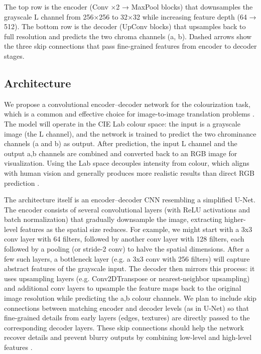 \documentclass{article} %
\begin{document}
The top row is the encoder (Conv ×2 → MaxPool blocks) that downsamples the grayscale L channel from 256×256 to 32×32 while increasing feature depth (64 → 512).
The bottom row is the decoder (UpConv blocks) that upsamples back to full resolution and predicts the two chroma channels (a, b). Dashed arrows show the three skip connections that pass fine-grained features from encoder to decoder stages.

\subsection{Architecture}

We propose a convolutional encoder–decoder network for the colourization task, which is a common and effective choice for image-to-image translation problems \cite{leatvanich2025image}. The model will operate in the CIE Lab colour space: the input is a grayscale image (the L channel), and the network is trained to predict the two chrominance channels (a and b) as output. After prediction, the input L channel and the output a,b channels are combined and converted back to an RGB image for visualization. Using the Lab space decouples intensity from colour, which aligns with human vision and generally produces more realistic results than direct RGB prediction \cite{leatvanich2025image}.

The architecture itself is an encoder–decoder CNN resembling a simplified U-Net. The encoder consists of several convolutional layers (with ReLU activations and batch normalization) that gradually downsample the image, extracting higher-level features as the spatial size reduces. For example, we might start with a 3x3 conv layer with 64 filters, followed by another conv layer with 128 filters, each followed by a pooling (or stride-2 conv) to halve the spatial dimensions. After a few such layers, a bottleneck layer (e.g. a 3x3 conv with 256 filters) will capture abstract features of the grayscale input. The decoder then mirrors this process: it uses upsampling layers (e.g. Conv2DTranspose or nearest-neighbor upsampling) and additional conv layers to upsample the feature maps back to the original image resolution while predicting the a,b colour channels. We plan to include skip connections between matching encoder and decoder levels (as in U-Net) so that fine-grained details from early layers (edges, textures) are directly passed to the corresponding decoder layers. These skip connections should help the network recover details and prevent blurry outputs by combining low-level and high-level features \cite{leatvanich2025image}.
\end{document}
